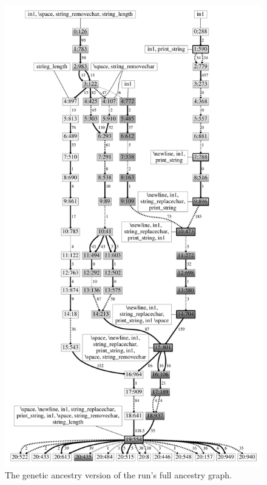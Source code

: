 \begin{figure}[tb!p] %
	\begin{center}
		\includegraphics[height=\textheight]{../figures/filtered_fill}
	\end{center}
	\caption{The genetic ancestry version of the run's full ancestry graph.}
	\label{fig:run0Filtered}       %
\end{figure}

